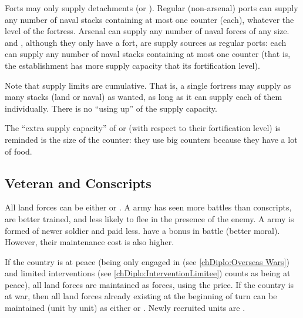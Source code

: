 \bparag Forts may only supply detachments (\ND or \NDE).
\bparag Regular (non-arsenal) ports can supply any number of naval stacks
containing at most one \FLEET counter (each), whatever the level of the
fortress.
\bparag Arsenal can supply any number of naval forces of any size.
\bparag \COL and \TP, although they only have a fort, are supply sources as
regular ports: each can supply any number of naval stacks containing at most
one \FLEET counter (that is, the establishment has more supply capacity that
its fortification level).

\begin{designnote}
  Note that supply limits are cumulative. That is, a single fortress may
  supply as many stacks (land or naval) as wanted, as long as it can supply
  each of them individually. There is no ``using up'' of the supply capacity.

  The ``extra supply capacity'' of \COL or \TP (with respect to their
  fortification level) is reminded is the size of the counter: they use big
  counters because they have a lot of food.
\end{designnote}



\subsection{Veteran and Conscripts}

 All land forces can be either
 or . A  army has seen more
battles than conscripts, are better trained, and less likely to flee in the
presence of the enemy. A  army is formed of newer soldier and
paid less.
\bparag {} have a bonus in battle (better moral). However, their
maintenance cost is also higher.

 If the country is at peace (being only engaged in
 (see \ref{chDiplo:Overseas Wars}) and limited
interventions (see \ref{chDiplo:InterventionLimitee}) counts as being at
peace), all land forces are maintained as  forces, using the
 price.
\bparag If the country is at war, then all land forces already existing at the
beginning of turn can be maintained (unit by unit) as either 
or . Newly recruited units are .

